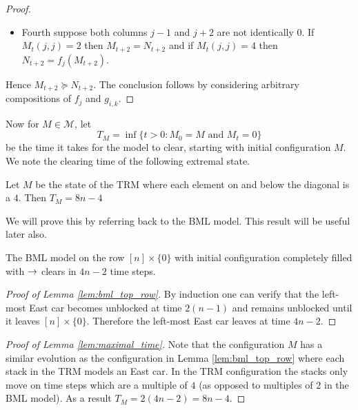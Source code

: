\documentclass[reqno]{amsart}
\begin{document}
\begin{proof}
\begin{itemize}
        Now consider $M_t(j-1,j-1) = 2$. If $M_t(j,j) = 4$ and $N_t(j+1,j+1) = 4$ then $N_{t+2} = (f_{j-1} \circ g_{j+1,j+1} \circ f_j)(M_{t+2})$.
        If $M_t(j,j) = 4$ and $N_t(j+1,j+1) = 2$ then $N_{t+2} = (f_{j-1} \circ f_{j+1} \circ f_j)(M_{t+2})$.
        If $M_t(j,j) = 2$ and $N_t(j+1,j+1) = 4$ then $N_{t+2} = (f_{j-1} \circ g_{j+1,j+1})(M_t)$. If $M_t(j,j) = 2$ and $N_t(j+1,j+1) = 2$ then $N_{t+2} = (f_{j-1} \circ f_{j+1}(M_t)$.

        \item Fourth suppose both columns $j-1$ and $j+2$ are not identically $0$. If $M_t(j,j) = 2$ then $M_{t+2} = N_{t+2}$ and if $M_t(j,j) = 4$ then $N_{t+2} = f_j(M_{t+2})$.
    \end{itemize}
    Hence $M_{t+2} \succeq N_{t+2}$. The conclusion follows by considering arbitrary compositions of $f_j$ and $g_{i,k}$.
\end{proof}

Now for $M \in \mathcal{M}$, let $$T_M = \inf\{ t>0: M_0 = M \text{ and } M_t=0\}$$ be the time it takes for the model to clear, starting with initial configuration $M$. We note the clearing time of the following extremal state.

\begin{lemma} \label{lem:maximal_time}
    Let $M$ be the state of the TRM where each element on and below the diagonal is a $4$. Then $T_{M} = 8n-4$
\end{lemma}


We will prove this by referring back to the BML model. This result will be useful later also.

\begin{lemma} \label{lem:bml_top_row}
    The BML model on the row $[n] \times \{0\}$ with initial configuration completely filled with $\mathord{\rightarrow}$ clears in $4n-2$ time steps.
\end{lemma}

\begin{proof}[Proof of Lemma \ref{lem:bml_top_row}]
    By induction one can verify that the left-most East car becomes unblocked at time $2(n-1)$ and remains unblocked until it leaves $[n] \times \{0\}$. Therefore the left-most East car leaves at time $4n-2$.
\end{proof}

\begin{proof} [Proof of Lemma \ref{lem:maximal_time}]
    Note that the configuration $M$ has a similar evolution as the configuration in Lemma \ref{lem:bml_top_row} where each stack in the TRM models an East car. In the TRM configuration the stacks only move on time steps which are a multiple of $4$ (as opposed to multiples of $2$ in the BML model). As a result $T_M = 2(4n-2) = 8n-4$.
\end{proof}
\end{document}
